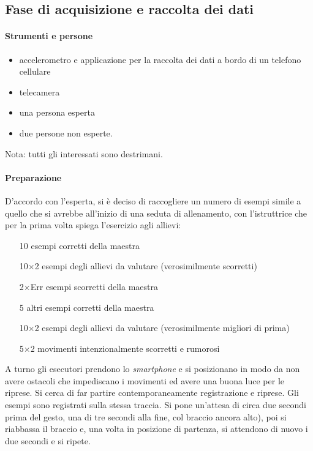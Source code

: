 \subsection{Fase di acquisizione e raccolta dei dati}

\paragraph{Strumenti e persone} 

\begin{itemize}
  \item accelerometro e applicazione per la raccolta dei dati a bordo di un telefono cellulare
  \item telecamera
  \item una persona esperta
  \item due persone non esperte.
\end{itemize}
Nota: tutti gli interessati sono destrimani.

\paragraph{Preparazione}
D'accordo con l'esperta,
si è deciso di raccogliere un numero di esempi
simile a quello che si avrebbe all'inizio di una seduta di allenamento,
con l'istruttrice che per la prima volta spiega l'esercizio agli allievi:
\begin{itemize}
	\item[10] esempi corretti della maestra
    \item[10$\times$2] esempi degli allievi da valutare (verosimilmente scorretti) 
    \item[2$\times$Err] esempi scorretti della maestra
    \item[5] altri esempi corretti della maestra
    \item[10$\times$2] esempi degli allievi da valutare (verosimilmente migliori di prima)
    \item[5$\times$2] movimenti intenzionalmente scorretti e rumorosi
\end{itemize}
A turno gli esecutori prendono lo \textit{smartphone} e
si posizionano in modo da non avere ostacoli che impediscano i movimenti
ed avere una buona luce per le riprese.
Si cerca di far partire contemporaneamente registrazione e riprese.
Gli esempi sono registrati sulla stessa traccia.
Si pone un'attesa di circa due secondi prima del gesto,
una di tre secondi alla fine, col braccio ancora alto),
poi si riabbassa il braccio e,
una volta in posizione di partenza,
si attendono di nuovo i due secondi e si ripete.



